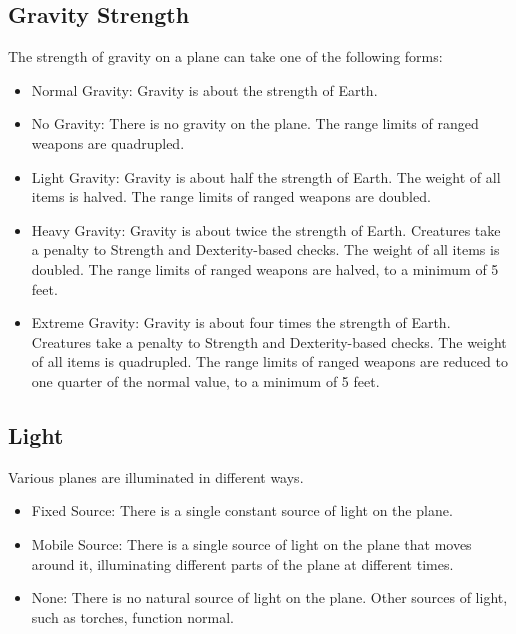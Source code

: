   \subsection{Gravity Strength} The strength of gravity on a plane can take one of the following forms:
    \begin{itemize}
      \item Normal Gravity: Gravity is about the strength of Earth.
      \item No Gravity: There is no gravity on the plane.
        The range limits of ranged weapons are quadrupled.
      \item Light Gravity: Gravity is about half the strength of Earth.
        The weight of all items is halved.
        The range limits of ranged weapons are doubled.
      \item Heavy Gravity: Gravity is about twice the strength of Earth.
        Creatures take a  penalty to Strength and Dexterity-based checks.
        The weight of all items is doubled.
        The range limits of ranged weapons are halved, to a minimum of 5 feet.
      \item Extreme Gravity: Gravity is about four times the strength of Earth.
        Creatures take a  penalty to Strength and Dexterity-based checks.
        The weight of all items is quadrupled.
        The range limits of ranged weapons are reduced to one quarter of the normal value, to a minimum of 5 feet.
    \end{itemize}

  \subsection{Light} Various planes are illuminated in different ways.
    \begin{itemize}
      \item Fixed Source: There is a single constant source of light on the plane.
      \item Mobile Source: There is a single source of light on the plane that moves around it, illuminating different parts of the plane at different times.
      \item None: There is no natural source of light on the plane.
        Other sources of light, such as torches, function normal.
    \end{itemize}

